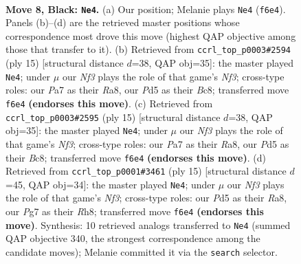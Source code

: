 \documentclass[11pt]{article}
\begin{document}
\begin{figure}[p]\centering
\begin{subfigure}{0.46\textwidth}\centering
\resizebox{\linewidth}{!}{%
\newchessgame
\chessboard[
  setfen={r1bqk2r/pp1nbppp/2p2n2/3p2B1/3P4/2N1P3/PP2BPPP/R2QK1NR b KQkq - 3 8},
  showmover=false,
  pgfstyle=straightmove, color=movearrow, markmove={f6-e4}
]}
\caption{}
\end{subfigure}\hfill
\begin{subfigure}{0.46\textwidth}\centering
\resizebox{\linewidth}{!}{%
\newchessgame
\chessboard[
  setfen={r1bqk2r/pp1nbppp/2p2n2/3p2B1/3P4/2NBP2P/PP3PP1/R2QK1NR b KQkq - 0 8},
  showmover=false,
  pgfstyle=straightmove, color=movearrow, markmove={f6-e4}
]}
\caption{}
\end{subfigure}
\\[4pt]
\begin{subfigure}{0.46\textwidth}\centering
\resizebox{\linewidth}{!}{%
\newchessgame
\chessboard[
  setfen={r1bqk2r/pp1nbppp/2p2n2/3p2B1/3P4/2NBP2P/PP3PP1/R2QK1NR b KQkq - 0 8},
  showmover=false,
  pgfstyle=straightmove, color=movearrow, markmove={f6-e4}
]}
\caption{}
\end{subfigure}\hfill
\begin{subfigure}{0.46\textwidth}\centering
\resizebox{\linewidth}{!}{%
\newchessgame
\chessboard[
  setfen={r1bqk2r/pp1nbppp/2p2n2/3p2B1/3P4/2NBPN2/PP3PPP/R2QK2R b KQkq - 3 8},
  showmover=false,
  pgfstyle=straightmove, color=movearrow, markmove={f6-e4}
]}
\caption{}
\end{subfigure}
\caption{\textbf{Move 8, Black: \texttt{Ne4}.} (a) Our position; Melanie plays \texttt{Ne4} (\texttt{f6e4}). Panels (b)--(d) are the retrieved master positions whose correspondence most drove this move (highest QAP objective among those that transfer to it). (b) Retrieved from \texttt{ccrl\_top\_p0003\#2594} (ply 15) [structural distance $d$=38, QAP obj=35]: the master played \texttt{Ne4}; under $\mu$ our \emph{Nf3} plays the role of that game's \emph{Nf3}; cross-type roles: our \emph{P}a7 as their \emph{R}a8, our \emph{P}d5 as their \emph{B}c8; transferred move \texttt{f6e4} \textbf{(endorses this move)}. (c) Retrieved from \texttt{ccrl\_top\_p0003\#2595} (ply 15) [structural distance $d$=38, QAP obj=35]: the master played \texttt{Ne4}; under $\mu$ our \emph{Nf3} plays the role of that game's \emph{Nf3}; cross-type roles: our \emph{P}a7 as their \emph{R}a8, our \emph{P}d5 as their \emph{B}c8; transferred move \texttt{f6e4} \textbf{(endorses this move)}. (d) Retrieved from \texttt{ccrl\_top\_p0001\#3461} (ply 15) [structural distance $d$=45, QAP obj=34]: the master played \texttt{Ne4}; under $\mu$ our \emph{Nf3} plays the role of that game's \emph{Nf3}; cross-type roles: our \emph{P}d5 as their \emph{R}a8, our \emph{P}g7 as their \emph{R}h8; transferred move \texttt{f6e4} \textbf{(endorses this move)}. Synthesis: 10 retrieved analogs transferred to \texttt{Ne4} (summed QAP objective 340, the strongest correspondence among the candidate moves); Melanie committed it via the \texttt{search} selector.}
\label{fig:thought-m15}
\end{figure}
\end{document}
